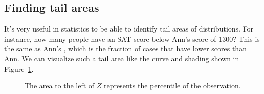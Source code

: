 \subsection{Finding tail areas}

It's very useful in statistics to be able to identify tail areas
of distributions.
For instance, how many people have an SAT score below
Ann's score of 1300?
This is the same as Ann's , which is
the fraction of cases that have lower scores than Ann.
We can visualize such a tail area like the curve and shading
shown in Figure~\ref{satBelow1300}.


\begin{figure}[h]
  \centering
  \caption{The area to the left of $Z$ represents the
      percentile of the observation.}
  \label{satBelow1300}
\end{figure}

